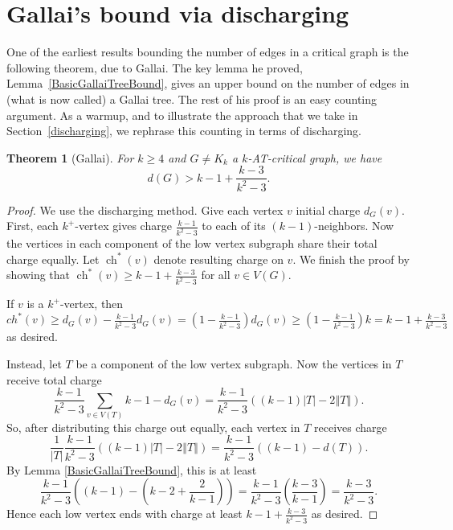 \documentclass[12pt]{article}
\theoremstyle{plain}
\newtheorem{thm}{Theorem}[section]
\theoremstyle{definition}
\theoremstyle{remark}
\newcommand{\size}[1]{\left\Vert#1\right\Vert}
\newcommand{\parens}[1]{\left( #1 \right)}
\newcommand{\ch}{\operatorname{ch}}
\begin{document}
\section{Gallai's bound via discharging}
\label{sec:gallai}

One of the earliest results bounding the number of edges in a critical graph is the following theorem, due to Gallai.  The key lemma he proved, Lemma~\ref{BasicGallaiTreeBound}, gives an upper bound on the number of edges in (what is now called) a Gallai tree.  The rest of his proof is an easy counting argument.  As a warmup, and to illustrate the approach that we take in Section~\ref{discharging}, we rephrase this counting in terms of discharging.

\begin{thm}[Gallai]
\label{thm:Gallai}
	For $k \ge 4$ and $G \ne K_k$ a $k$-AT-critical graph, we have
	\[d(G) > k-1 + \frac{k-3}{k^2-3}.\]
\end{thm}
\begin{proof}
    We use the discharging method. Give each vertex $v$ initial charge $d_G(v)$.  First, each $k^+$-vertex gives charge
    $\frac{k-1}{k^2-3}$ to each of its $(k-1)$-neighbors.  Now the vertices in each component of the low vertex subgraph share  
    their total charge equally.  Let $\ch^*(v)$ denote resulting charge on $v$.  We finish the proof by showing that $\ch^*(v) 
    \ge k-1 + \frac{k-3}{k^2-3}$ for all $v \in V(G)$.
	
	If $v$ is a $k^+$-vertex, then $ch^*(v) \ge d_G(v) - \frac{k-1}{k^2-3}d_G(v) = \parens{1- \frac{k-1}{k^2-3}}d_G(v) \ge \parens{1- \frac{k-1}{k^2-3}}k = k-1 + \frac{k-3}{k^2-3}$ as desired.

	Instead, let $T$ be a component of the low vertex subgraph.  Now the vertices in $T$ receive total charge
	\[\frac{k-1}{k^2-3}\sum_{v \in V(T)} k-1 - d_G(v) = \frac{k-1}{k^2-3}\parens{(k-1)|T| - 2\size{T}}.\]
	So, after distributing this charge out equally, each vertex in $T$ receives charge
	\[\frac{1}{|T|}\frac{k-1}{k^2-3}((k-1)|T| - 2\size{T}) = \frac{k-1}{k^2-3}\parens{(k-1) - d(T)}.\]
	By Lemma \ref{BasicGallaiTreeBound}, this is at least
	\[\frac{k-1}{k^2-3}\parens{(k-1) - \parens{k-2 + \frac{2}{k-1}}} = \frac{k-1}{k^2-3}\parens{\frac{k-3}{k-1}} = \frac{k-3}{k^2-3}.\]
	Hence each low vertex ends with charge at least $k-1 + \frac{k-3}{k^2-3}$ as desired.
\end{proof}
\end{document}
